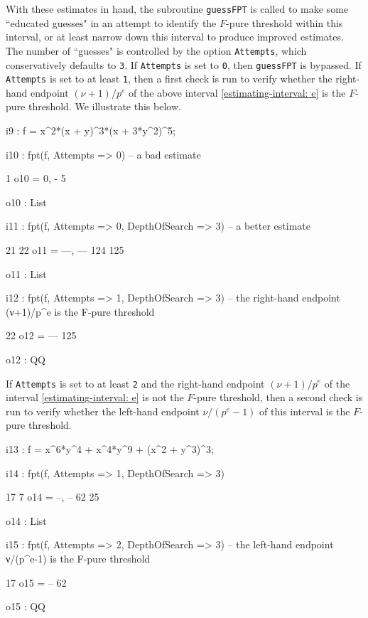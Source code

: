 \documentclass{amsart}
\begin{document}
With these estimates in hand, the subroutine \texttt{guessFPT} is called to make some ``educated guesses" in an attempt to identify the $F$-pure threshold within this interval, or at least narrow down this interval to produce improved estimates.  The number of ``guesses" is controlled by the option \texttt{Attempts}, which conservatively defaults to \texttt{3}.  If \texttt{Attempts} is set to \texttt{0}, then \texttt{guessFPT} is bypassed. If  \texttt{Attempts} is set to at least \texttt{1}, then a first check is run to verify whether the right-hand endpoint $(\nu+1)/p^e$ of the above interval \eqref{estimating-interval: e} is the $F$-pure threshold.  We illustrate this below.

\smallskip
{\small
{}
\begin{MyVerbatim}
i9 : f = x^2*(x + y)^3*(x + 3*y^2)^5;

i10 : fpt(f, Attempts => 0) -- a bad estimate

          1
o10 = {0, -}
          5

o10 : List

i11 : fpt(f, Attempts => 0, DepthOfSearch => 3) -- a better estimate

        21   22
o11 = {---, ---}
       124  125

o11 : List

i12 : fpt(f, Attempts => 1, DepthOfSearch => 3) -- the right-hand endpoint
      (ν+1)/p^e is the F-pure threshold

       22
o12 = ---
      125

o12 : QQ
\end{MyVerbatim}
}
\smallskip

If  \texttt{Attempts} is set to at least \texttt{2} and the right-hand endpoint $(\nu+1)/p^e$ of the interval \eqref{estimating-interval: e} is not the $F$-pure threshold, then a second check is run to verify whether the left-hand endpoint $\nu/(p^e-1)$ of this interval is the $F$-pure threshold.

\smallskip
{\small
{}
\begin{MyVerbatim}
i13 : f = x^6*y^4 + x^4*y^9 + (x^2 + y^3)^3;

i14 : fpt(f, Attempts => 1, DepthOfSearch => 3)

       17   7
o14 = {--, --}
       62  25

o14 : List

i15 : fpt(f, Attempts => 2, DepthOfSearch => 3) -- the left-hand endpoint
      ν/(p^e-1) is the F-pure threshold

      17
o15 = --
      62

o15 : QQ
\end{MyVerbatim}
}
\smallskip
\end{document}
